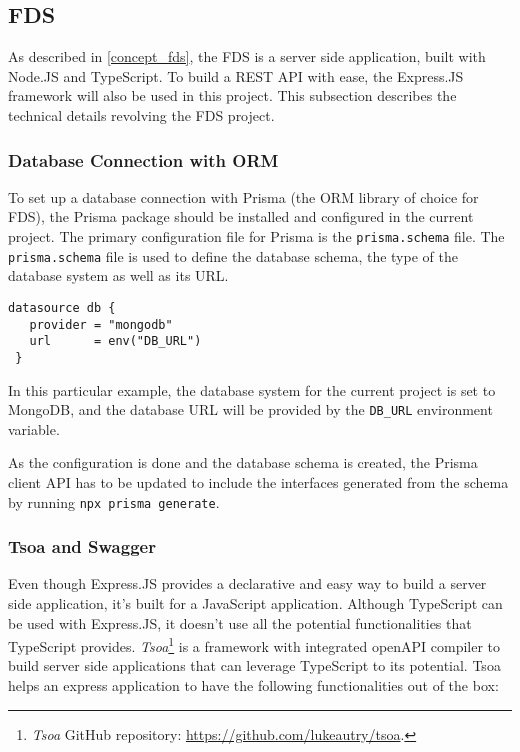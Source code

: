  \subsection{FDS}
 As described in \autoref{concept_fds}, the FDS is a server side application, built with Node.JS and TypeScript. To build a REST API with ease, the Express.JS framework will also be used in this project. This subsection describes the technical details revolving the FDS project. 
  
  \subsubsection{Database Connection with ORM}
   To set up a database connection with Prisma (the ORM library of choice for FDS), the Prisma package should be installed and configured in the current project. The primary configuration file for Prisma is the \verb;prisma.schema; file. The \verb;prisma.schema; file is used to define the database schema, the type of the database system as well as its URL. 

   \begin{lstlisting}[caption={Configuring database type and URL (Prisma)}]
 datasource db {
   provider = "mongodb"
   url      = env("DB_URL")
 }  
   \end{lstlisting}

   In this particular example, the database system for the current project is set to MongoDB, and the database URL will be provided by the \verb;DB_URL; environment variable.

   As the configuration is done and the database schema is created, the Prisma client API has to be updated to include the interfaces generated from the schema by running \verb;npx prisma generate;.
   
  \subsubsection{Tsoa and Swagger}
  Even though Express.JS provides a declarative and easy way to build a server side application, it's built for a JavaScript application. Although TypeScript can be used with Express.JS, it doesn't use all the potential functionalities that TypeScript provides. \emph{Tsoa}\footnote{\emph{Tsoa} GitHub repository: \url{https://github.com/lukeautry/tsoa}.} is a framework with integrated openAPI compiler to build server side applications that can leverage TypeScript to its potential. Tsoa helps an express application to have the following functionalities out of the box:

